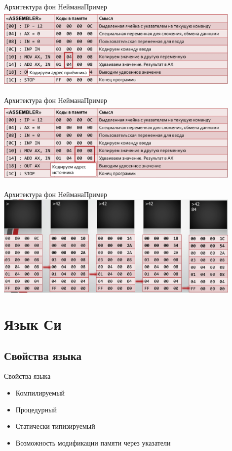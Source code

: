 \documentclass[10pt]{beamer}
\begin{document}
\begin{frame}[fragile]{Архитектура фон Неймана}{Пример}
\includegraphics[width=12cm, height=4cm]{Term_1/Source/Pirctures/example2.jpg}
\end{frame}

\begin{frame}[fragile]{Архитектура фон Неймана}{Пример}
\includegraphics[width=12cm, height=4cm]{Term_1/Source/Pirctures/example3.jpg}
\end{frame}

\begin{frame}[fragile]{Архитектура фон Неймана}{Пример}
\includegraphics[width=12cm, height=5cm]{Term_1/Source/Pirctures/example-run.jpg}
\end{frame}

\section{Язык Си}
\subsection{Свойства языка}
\begin{frame}[fragile]{Свойства языка}
\begin{itemize}
    \item Компилируемый
    \item Процедурный
    \item Статически типизируемый
    \item Возможность модификации памяти через указатели
\end{itemize}
\end{frame}
\end{document}
